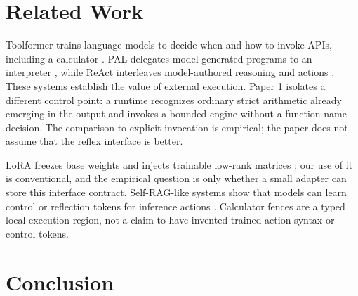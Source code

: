 \documentclass[11pt]{article}
\begin{document}
\section{Related Work}

Toolformer trains language models to decide when and how to invoke APIs,
including a calculator \cite{toolformer}. PAL delegates model-generated programs
to an interpreter \cite{pal}, while ReAct interleaves model-authored reasoning and
actions \cite{react}. These systems establish the value of external execution.
Paper 1 isolates a different control point: a runtime recognizes ordinary strict
arithmetic already emerging in the output and invokes a bounded engine without a
function-name decision. The comparison to explicit invocation is empirical; the
paper does not assume that the reflex interface is better.

LoRA freezes base weights and injects trainable low-rank matrices
\cite{lora}; our use of it is conventional, and the empirical question is only
whether a small adapter can store this interface contract. Self-RAG-like systems
show that models can learn control or reflection tokens for inference actions
\cite{selfrag}. Calculator fences are a typed local execution region, not a claim
to have invented trained action syntax or control tokens.

\section{Conclusion}
\end{document}
